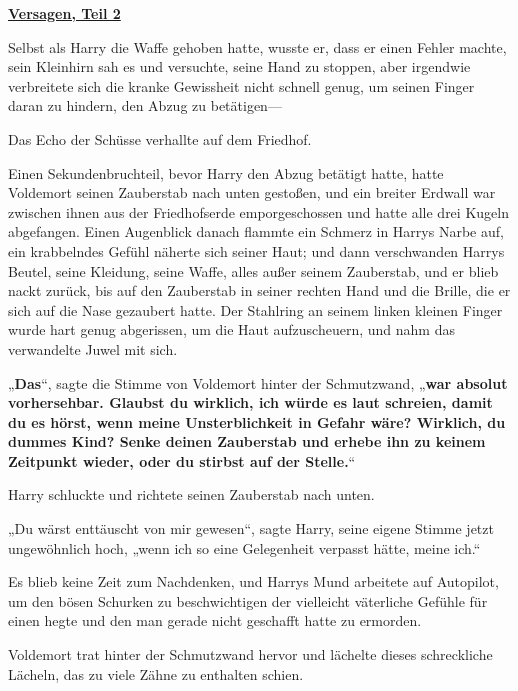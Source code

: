 

\hypertarget{versagen-teil-2}{%

\textbf{\uline{Versagen, Teil 2}}

Selbst als Harry die Waffe gehoben hatte, wusste er, dass er einen Fehler machte, sein Kleinhirn sah es und versuchte, seine Hand zu stoppen, aber irgendwie verbreitete sich die kranke Gewissheit nicht schnell genug, um seinen Finger daran zu hindern, den Abzug zu betätigen—

Das Echo der Schüsse verhallte auf dem Friedhof.

Einen Sekundenbruchteil, bevor Harry den Abzug betätigt hatte, hatte Voldemort seinen Zauberstab nach unten gestoßen, und ein breiter Erdwall war zwischen ihnen aus der Friedhofserde emporgeschossen und hatte alle drei Kugeln abgefangen. Einen Augenblick danach flammte ein Schmerz in Harrys Narbe auf, ein krabbelndes Gefühl näherte sich seiner Haut; und dann verschwanden Harrys Beutel, seine Kleidung, seine Waffe, alles außer seinem Zauberstab, und er blieb nackt zurück, bis auf den Zauberstab in seiner rechten Hand und die Brille, die er sich auf die Nase gezaubert hatte. Der Stahlring an seinem linken kleinen Finger wurde hart genug abgerissen, um die Haut aufzuscheuern, und nahm das verwandelte Juwel mit sich.

„\textbf{Das}“, sagte die Stimme von Voldemort hinter der Schmutzwand, „\textbf{war absolut vorhersehbar. Glaubst du wirklich, ich würde es laut schreien, damit du es hörst, wenn meine Unsterblichkeit in Gefahr wäre? Wirklich, du dummes Kind? Senke deinen Zauberstab und erhebe ihn zu keinem Zeitpunkt wieder, oder du stirbst auf der Stelle.}“

Harry schluckte und richtete seinen Zauberstab nach unten.

„Du wärst enttäuscht von mir gewesen“, sagte Harry, seine eigene Stimme jetzt ungewöhnlich hoch, „wenn ich so eine Gelegenheit verpasst hätte, meine ich.“

Es blieb keine Zeit zum Nachdenken, und Harrys Mund arbeitete auf Autopilot, um den bösen Schurken zu beschwichtigen der vielleicht väterliche Gefühle für einen hegte und den man gerade nicht geschafft hatte zu ermorden.

Voldemort trat hinter der Schmutzwand hervor und lächelte dieses schreckliche Lächeln, das zu viele Zähne zu enthalten schien.

}
